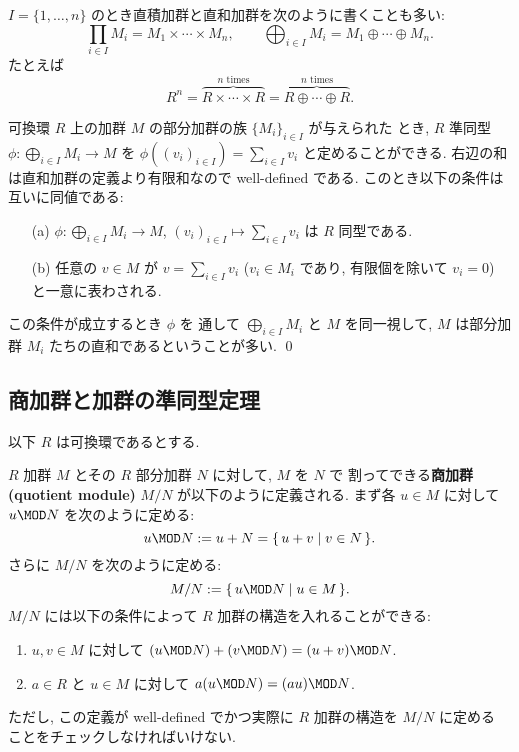 \documentclass[12pt,twoside]{jarticle}
\begin{document}
$I=\{1,\dots,n\}$ のとき直積加群と直和加群を次のように書くことも多い:
\begin{equation*}
  \prod_{i\in I}M_i = M_1\times\cdots\times M_n,
  \qquad
  \bigoplus_{i\in I}M_i = M_1\oplus\cdots\oplus M_n.
\end{equation*}
たとえば
\begin{equation*}
  R^n 
  = \overbrace{R\times\cdots\times R}^{\text{$n$ times}}
  = \overbrace{R\oplus\cdots\oplus R}^{\text{$n$ times}}.
\end{equation*}

\begin{question}[直和加群2]
\label{q:direct-sum-module-2}
  可換環 $R$ 上の加群 $M$ の部分加群の族 $\{M_i\}_{i\in I}$ が与えられた
  とき, $R$ 準同型 $\phi:\bigoplus_{i\in I}M_i\to M$ 
  を $\phi((v_i)_{i\in I})=\sum_{i\in I}v_i$ と定めることができる.
  右辺の和は直和加群の定義より有限和なので well-defined である.
  このとき以下の条件は互いに同値である:
  \begin{enumerate}
  \item[(a)] $\phi:\bigoplus_{i\in I}M_i\to M$, 
    $(v_i)_{i\in I}\mapsto\sum_{i\in I}v_i$ は $R$ 同型である.
  \item[(b)] 任意の $v\in M$ が $v = \sum_{i\in I} v_i$ \enspace
    ($v_i\in M_i$ であり, 有限個を除いて $v_i=0$) と一意に表わされる.
  \end{enumerate}
  この条件が成立するとき $\phi$ を
  通して $\bigoplus_{i\in I}M_i$ と $M$ を同一視して,
  $M$ は部分加群 $M_i$ たちの直和であるということが多い.
  \qed
\end{question}


\subsection{商加群と加群の準同型定理}
\label{sec:quotient-module}

以下 $R$ は可換環であるとする.

$R$ 加群 $M$ とその $R$ 部分加群 $N$ に対して, $M$ を $N$ で
割ってできる{\bf 商加群 (quotient module)} $M/N$ が以下のように定義される.
まず各 $u\in M$ に対して $u\MOD N$ を次のように定める:
\begin{equation*}
  u\MOD N := u + N = \{\, u + v \mid v\in N \,\}.
\end{equation*}
さらに $M/N$ を次のように定める:
\begin{equation*}
  M/N := \{\, u\MOD N \mid u \in M \,\}.
\end{equation*}
$M/N$ には以下の条件によって $R$ 加群の構造を入れることができる:
\begin{enumerate}
\item $u,v\in M$ に対して $(u\MOD N) + (v\MOD N) = (u+v)\MOD N$.
\item $a\in R$ と $u\in M$ に対して $a(u\MOD N) = (au)\MOD N$.
\end{enumerate}
ただし, この定義が well-defined でかつ実際に $R$ 加群の構造を $M/N$ に定める
ことをチェックしなければいけない.
\end{document}
